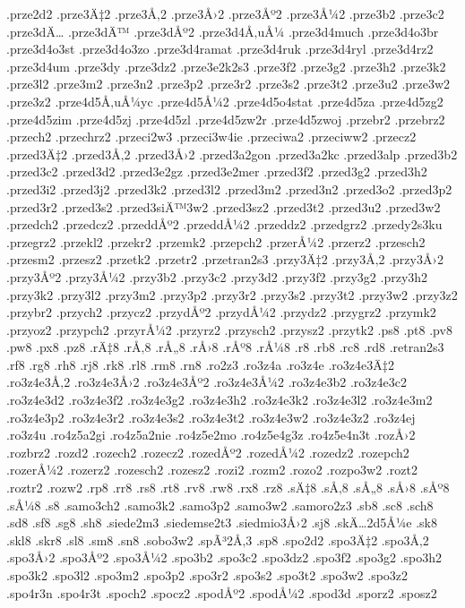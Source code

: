 {.prze2d2
.prze3Ä‡2
.prze3Å‚2
.prze3Å›2
.prze3Åº2
.prze3Å¼2
.prze3b2
.prze3c2
.prze3dÄ…
.prze3dÄ™
.prze3dÅº2
.prze3d4Å‚uÅ¼
.prze3d4much
.prze3d4o3br
.prze3d4o3st
.prze3d4o3zo
.prze3d4ramat
.prze3d4ruk
.prze3d4ryl
.prze3d4rz2
.prze3d4um
.prze3dy
.prze3dz2
.prze3e2k2s3
.prze3f2
.prze3g2
.prze3h2
.prze3k2
.prze3l2
.prze3m2
.prze3n2
.prze3p2
.prze3r2
.prze3s2
.prze3t2
.prze3u2
.prze3w2
.prze3z2
.prze4d5Å‚uÅ¼yc
.prze4d5Å¼2
.prze4d5o4stat
.prze4d5za
.prze4d5zg2
.prze4d5zim
.prze4d5zj
.prze4d5zl
.prze4d5zw2r
.prze4d5zwoj
.przebr2
.przebrz2
.przech2
.przechrz2
.przeci2w3
.przeci3w4ie
.przeciwa2
.przeciww2
.przecz2
.przed3Ä‡2
.przed3Å‚2
.przed3Å›2
.przed3a2gon
.przed3a2kc
.przed3alp
.przed3b2
.przed3c2
.przed3d2
.przed3e2gz
.przed3e2mer
.przed3f2
.przed3g2
.przed3h2
.przed3i2
.przed3j2
.przed3k2
.przed3l2
.przed3m2
.przed3n2
.przed3o2
.przed3p2
.przed3r2
.przed3s2
.przed3siÄ™3w2
.przed3sz2
.przed3t2
.przed3u2
.przed3w2
.przedch2
.przedcz2
.przeddÅº2
.przeddÅ¼2
.przeddz2
.przedgrz2
.przedy2s3ku
.przegrz2
.przekl2
.przekr2
.przemk2
.przepch2
.przerÅ¼2
.przerz2
.przesch2
.przesm2
.przesz2
.przetk2
.przetr2
.przetran2s3
.przy3Ä‡2
.przy3Å‚2
.przy3Å›2
.przy3Åº2
.przy3Å¼2
.przy3b2
.przy3c2
.przy3d2
.przy3f2
.przy3g2
.przy3h2
.przy3k2
.przy3l2
.przy3m2
.przy3p2
.przy3r2
.przy3s2
.przy3t2
.przy3w2
.przy3z2
.przybr2
.przych2
.przycz2
.przydÅº2
.przydÅ¼2
.przydz2
.przygrz2
.przymk2
.przyoz2
.przypch2
.przyrÅ¼2
.przyrz2
.przysch2
.przysz2
.przytk2
.ps8
.pt8
.pv8
.pw8
.px8
.pz8
.rÄ‡8
.rÅ‚8
.rÅ„8
.rÅ›8
.rÅº8
.rÅ¼8
.r8
.rb8
.rc8
.rd8
.retran2s3
.rf8
.rg8
.rh8
.rj8
.rk8
.rl8
.rm8
.rn8
.ro2z3
.ro3z4a
.ro3z4e
.ro3z4e3Ä‡2
.ro3z4e3Å‚2
.ro3z4e3Å›2
.ro3z4e3Åº2
.ro3z4e3Å¼2
.ro3z4e3b2
.ro3z4e3c2
.ro3z4e3d2
.ro3z4e3f2
.ro3z4e3g2
.ro3z4e3h2
.ro3z4e3k2
.ro3z4e3l2
.ro3z4e3m2
.ro3z4e3p2
.ro3z4e3r2
.ro3z4e3s2
.ro3z4e3t2
.ro3z4e3w2
.ro3z4e3z2
.ro3z4ej
.ro3z4u
.ro4z5a2gi
.ro4z5a2nie
.ro4z5e2mo
.ro4z5e4g3z
.ro4z5e4n3t
.rozÅ›2
.rozbrz2
.rozd2
.rozech2
.rozecz2
.rozedÅº2
.rozedÅ¼2
.rozedz2
.rozepch2
.rozerÅ¼2
.rozerz2
.rozesch2
.rozesz2
.rozi2
.rozm2
.rozo2
.rozpo3w2
.rozt2
.roztr2
.rozw2
.rp8
.rr8
.rs8
.rt8
.rv8
.rw8
.rx8
.rz8
.sÄ‡8
.sÅ‚8
.sÅ„8
.sÅ›8
.sÅº8
.sÅ¼8
.s8
.samo3ch2
.samo3k2
.samo3p2
.samo3w2
.samoro2z3
.sb8
.sc8
.sch8
.sd8
.sf8
.sg8
.sh8
.siede2m3
.siedemse2t3
.siedmio3Å›2
.sj8
.skÄ…2d5Å¼e
.sk8
.skl8
.skr8
.sl8
.sm8
.sn8
.sobo3w2
.spÃ³2Å‚3
.sp8
.spo2d2
.spo3Ä‡2
.spo3Å‚2
.spo3Å›2
.spo3Åº2
.spo3Å¼2
.spo3b2
.spo3c2
.spo3dz2
.spo3f2
.spo3g2
.spo3h2
.spo3k2
.spo3l2
.spo3m2
.spo3p2
.spo3r2
.spo3s2
.spo3t2
.spo3w2
.spo3z2
.spo4r3n
.spo4r3t
.spoch2
.spocz2
.spodÅº2
.spodÅ¼2
.spod3d
.sporz2
.sposz2
}
